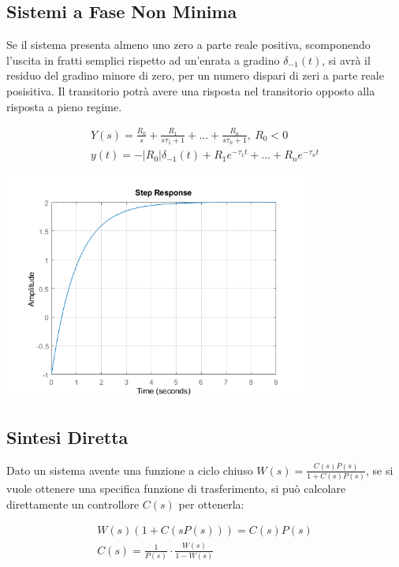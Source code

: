 \documentclass{article}
\numberwithin{equation}{subsection}
\begin{document}
\subsection{Sistemi a Fase Non Minima}

Se il sistema presenta almeno uno zero a parte reale positiva, scomponendo l'uscita in fratti semplici rispetto ad un'enrata a gradino $\delta_{-1}(t)$, si avrà il residuo 
del gradino minore di zero, per un numero dispari di zeri a parte reale posisitiva. Il transitorio potrà avere una risposta nel transitorio opposto alla risposta a pieno regime. 

\begin{gather}
    Y(s)=\displaystyle\frac{R_0}{s}+\frac{R_1}{s\tau_1+1}+...+\frac{R_n}{s\tau_n+1},\:R_0<0\\
    y(t)=-|R_0|\delta_{-1}(t)+R_1e^{-\tau_1t}+...+R_ne^{-\tau_nt}
\end{gather}

\begin{center}
    \includegraphics[width=10cm]{Step1.png}
\end{center}

\subsection{Sintesi Diretta}

Dato un sistema avente una funzione a ciclo chiuso $W(s)=\displaystyle\frac{C(s)P(s)}{1+C(s)P(s)}$, se si vuole ottenere una specifica funzione di trasferimento, si può 
calcolare direttamente un controllore $C(s)$ per ottenerla: 

\begin{gather}
    W(s)(1+C(sP(s)))=C(s)P(s)\\
    C(s)=\displaystyle\frac{1}{P(s)}\cdot\frac{W(s)}{1-W(s)}
\end{gather}
\end{document}
